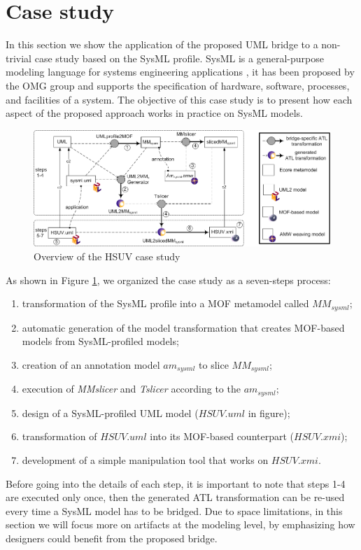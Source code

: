 \section{Case study}\label{sec:caseStudy}
In this section we show the application of the proposed UML bridge to a non-trivial case study based on the SysML profile.
SysML is a general-purpose modeling language for systems engineering applications \cite{sysml}, it has been proposed by the OMG group
and supports the specification of  hardware, software, processes, and facilities of a system.
The objective of this case study is to present how each aspect of the proposed approach works in practice on SysML models.

\begin{figure}[htbp]
	\centering
		\includegraphics[width=1\textwidth]{figures/caseStudy.png}
	\caption{Overview of the HSUV case study}
	\label{fig:caseStudy}
\end{figure}

As shown in Figure \ref{fig:caseStudy}, we organized the case study as a seven-steps process:
%
\begin{enumerate}
	\item transformation of the SysML profile into a MOF metamodel called $MM_{sysml}$;
	\item automatic generation of the model transformation that creates MOF-based models from SysML-profiled models;
	\item creation of an annotation model $am_{sysml}$ to slice $MM_{sysml}$;
	\item execution of \textit{MMslicer} and \textit{Tslicer} according to the $am_{sysml}$;
	\item design of a SysML-profiled UML model ($HSUV.uml$ in figure);
	\item transformation of $HSUV.uml$ into its MOF-based counterpart ($HSUV.xmi$);
	\item development of a simple manipulation tool that works on $HSUV.xmi$.
\end{enumerate}
%
Before going into the details of each step, it is important to note that steps 1-4 are executed only once, 
then the generated ATL transformation can be re-used every time a SysML model has to be bridged.
Due to space limitations, in this section we will focus more on artifacts at the modeling level, by emphasizing
how designers could benefit from the proposed bridge.

